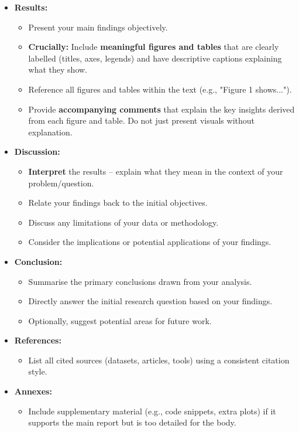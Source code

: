 \documentclass[11pt]{exam}
\begin{document}
\begin{itemize}
        \item \textbf{Results:}
        \begin{itemize}
            \item Present your main findings objectively.
            \item \textbf{Crucially:} Include \textbf{meaningful figures and tables} that are clearly labelled (titles, axes, legends) and have descriptive captions explaining what they show. %
            \item Reference all figures and tables within the text (e.g., "Figure 1 shows...").
            \item Provide \textbf{accompanying comments} that explain the key insights derived from each figure and table. Do not just present visuals without explanation.
        \end{itemize}

        \item \textbf{Discussion:}
        \begin{itemize}
            \item \textbf{Interpret} the results – explain what they mean in the context of your problem/question.
            \item Relate your findings back to the initial objectives.
            \item Discuss any limitations of your data or methodology.
            \item Consider the implications or potential applications of your findings.
        \end{itemize}

        \item \textbf{Conclusion:}
        \begin{itemize}
            \item Summarise the primary conclusions drawn from your analysis. %
            \item Directly answer the initial research question based on your findings.
            \item Optionally, suggest potential areas for future work.
        \end{itemize}

        \item \textbf{References:}
        \begin{itemize}
            \item List all cited sources (datasets, articles, tools) using a consistent citation style.
        \end{itemize}

        \item \textbf{Annexes:} %
        \begin{itemize}
            \item Include supplementary material (e.g., code snippets, extra plots) if it supports the main report but is too detailed for the body.
        \end{itemize}
    \end{itemize}
\end{document}

